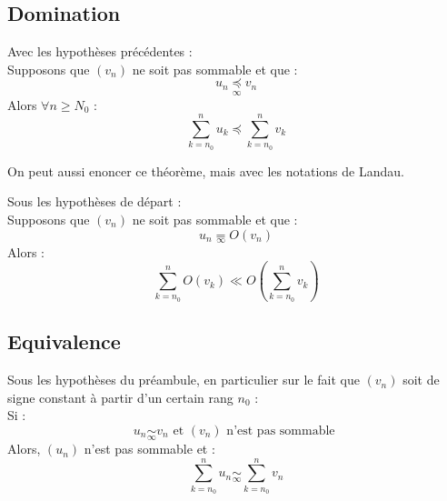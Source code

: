 \subsection{Domination}
\begin{theo}
Avec les hypothèses précédentes :\\
Supposons que $(v_n)$ ne soit pas sommable et que  :
$$u_n \underset{\infty}\preccurlyeq v_n$$
Alors $\forall n \geq N_0$ : 
$$\sum_{k=n_0}^{n} u_k \preccurlyeq \sum_{k=n_0}^{n} v_k$$
\end{theo}
On peut aussi enoncer ce théorème, mais avec les notations de Landau.
\begin{theo}
Sous les hypothèses de départ : \\
Supposons que $(v_n)$ ne soit pas sommable et que : 
$$u_n \underset{\infty}= O(v_n) $$
Alors : 
$$\sum_{k=n_0}^{n} O(v_k) \ll O(\sum_{k=n_0}^{n} v_k)$$
\end{theo}
\subsection{Equivalence}
Sous les hypothèses du préambule, en particulier sur le fait que $(v_n)$ soit de signe constant à partir d'un certain rang $n_0$ : \\
Si : 
$$u_n \underset{\infty}\sim v_n \mbox{ et } (v_n) \mbox{ n'est pas sommable }$$
Alors, $(u_n)$ n'est pas sommable et : 
$$\sum_{k=n_0}^{n}u_n \underset{\infty}\sim \sum_{k=n_0}^{n}v_n$$
